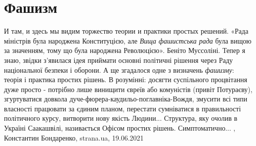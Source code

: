  
 
 
 
 
\chapter{Фашизм}

И там, и здесь мы видим торжество теории и практики простых решений. «Рада
міністрів була народжена Конституцією, але \emph{Вища фашистська рада} була
вищою за значенням, тому що була народжена Революцією». Беніто Муссоліні.
Тепер я знаю, звідки з'явилася ідея приймати основні політичні рішення через
Раду національної безпеки і оборони.  А ще згадалося одне з визначень
\emph{фашизму}: теорія і практика простих рішень. В розумінні: досягти
суспільного процвітання дуже просто - потрібно лише винищити євреїв або
комуністів (привіт Потураєву), згуртуватися довкола
дуче-фюрера-каудильо-поглавніка-Вождя, змусити всі типи власності працювати за
єдиним планом, перестати сумніватися в правильності політичного курсу,
витворити нову якість Людини... Структура, яку очолив в Україні Саакашвілі,
називається Офісом простих рішень. Симптоматично...
, 
Константин Бондаренко, strana.ua, 19.06.2021

